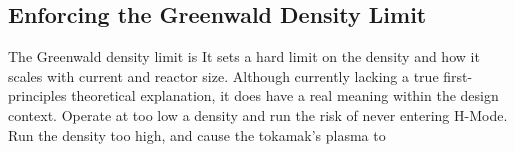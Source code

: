 \subsection{Enforcing the Greenwald Density Limit}

The Greenwald density limit is  It sets a hard limit on the density and how it scales with current and reactor size. Although currently lacking a true first-principles theoretical explanation, it does have a real meaning within the design context. Operate at too low a density and run the risk of never entering H-Mode. Run the density too high, and cause the tokamak's plasma to  

